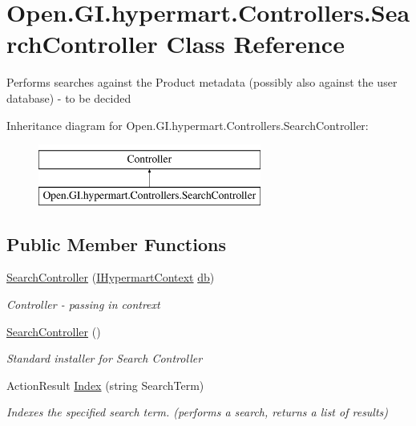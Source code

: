 \hypertarget{class_open_1_1_g_i_1_1hypermart_1_1_controllers_1_1_search_controller}{}\section{Open.\+G\+I.\+hypermart.\+Controllers.\+Search\+Controller Class Reference}
\label{class_open_1_1_g_i_1_1hypermart_1_1_controllers_1_1_search_controller}


Performs searches against the Product metadata (possibly also against the user database) -\/ to be decided  


Inheritance diagram for Open.\+G\+I.\+hypermart.\+Controllers.\+Search\+Controller\+:\begin{figure}[H]
\begin{center}
\leavevmode
\includegraphics[height=2.000000cm]{class_open_1_1_g_i_1_1hypermart_1_1_controllers_1_1_search_controller}
\end{center}
\end{figure}
\subsection*{Public Member Functions}
\begin{DoxyCompactItemize}
\item 
\hyperlink{class_open_1_1_g_i_1_1hypermart_1_1_controllers_1_1_search_controller_a91d14626e4163f0af2ccc84b135a8949}{Search\+Controller} (\hyperlink{interface_open_1_1_g_i_1_1hypermart_1_1_d_a_l_1_1_i_hypermart_context}{I\+Hypermart\+Context} \hyperlink{class_open_1_1_g_i_1_1hypermart_1_1_controllers_1_1_search_controller_ac0b1c112b3b87593f00d2fd7fe7f1a07}{db})
\begin{DoxyCompactList}\small\item\em Controller -\/ passing in contrext \end{DoxyCompactList}\item 
\hyperlink{class_open_1_1_g_i_1_1hypermart_1_1_controllers_1_1_search_controller_a8bd1641a18d5720e47a17e91e8957977}{Search\+Controller} ()
\begin{DoxyCompactList}\small\item\em Standard installer for Search Controller \end{DoxyCompactList}\item 
Action\+Result \hyperlink{class_open_1_1_g_i_1_1hypermart_1_1_controllers_1_1_search_controller_a92174a9db0c7ca485afd0c513ad8f66d}{Index} (string Search\+Term)
\begin{DoxyCompactList}\small\item\em Indexes the specified search term. (performs a search, returns a list of results) \end{DoxyCompactList}\end{DoxyCompactItemize}
